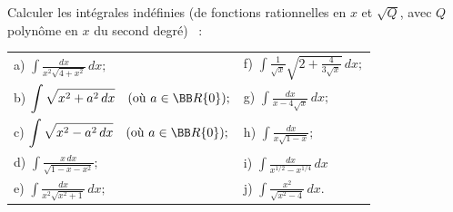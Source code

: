 \documentclass[12pt,french,oneside,a4paper]{memoir} %
\begin{document}
\begin{exo}
Calculer les intégrales indéfinies (de fonctions
rationnelles en $x$ et $\sqrt Q$, avec $Q$ polynôme en $x$ du
second degré) ~:
\begin{center}
\begin{tabular}{ll}
a) $\displaystyle{\int\frac{dx}{x^2\sqrt{4+x^2}}\,dx};$\qquad&\qquad
f) $\displaystyle{\int\frac{1}{\sqrt x}\sqrt{2+\frac{4}{3\sqrt
 x}}\,dx};$\\[4mm]
b) $\displaystyle{\int\sqrt{x^2+a^2\,dx}\quad(\mbox{où
}a\in{\BB R}\{0\})};$\qquad&\qquad
g) $\displaystyle{\int\frac{dx}{x-4\sqrt x}\,dx};$\\[4mm]
c) $\displaystyle{\int\sqrt{x^2-a^2\,dx}\quad(\mbox{où
}a\in{\BB R}\{0\})};$\qquad&\qquad
h) $\displaystyle{\int\frac{dx}{x\sqrt{1- x}}};$\\[4mm]
d) $\displaystyle{\int\frac{x\,dx}{\sqrt{1-x-x^2}}};$\qquad&\qquad
i) $\displaystyle{\int\frac{dx}{x^{1/2}-x^{1/4}}\,dx}$\\[4mm]
e) $\displaystyle{\int\frac{dx}{x^2\sqrt{x^2+1}}\,dx};$\qquad&\qquad
j) $\displaystyle{\int\frac{x^2}{\sqrt{x^2-4}}\,dx}.$
\end{tabular}
\end{center}
\end{exo}
\end{document}
